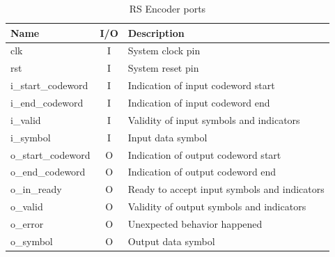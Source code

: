\documentclass[conference]{IEEEtran}
\begin{document}
\begin{table}[!hbt]
\label{tab:t2}
\caption{RS Encoder ports}
\begin{tabular}{lcl}
\toprule
Name               & I/O & Description                                                                                                    \\
\midrule
clk                & I   & System clock pin                                                                                               \\
rst                & I   & System reset pin                                                                                               \\
i\_start\_codeword & I   & Indication of input codeword start                                                                             \\
i\_end\_codeword   & I   & Indication of input codeword end                                                                               \\
i\_valid           & I   & Validity of input symbols and indicators                                                                   \\
i\_symbol          & I   & Input data symbol                                                                                              \\
o\_start\_codeword & O   & Indication of output codeword start                                                                            \\
o\_end\_codeword   & O   & Indication of output codeword end                                                                              \\
o\_in\_ready       & O   & Ready to accept input symbols and indicators\\
o\_valid           & O   & Validity of output symbols and indicators                                                                  \\
o\_error           & O   & Unexpected behavior happened                                                                                   \\
o\_symbol          & O   & Output data symbol                                                                                            
\\
\bottomrule
\end{tabular}
\end{table}
\end{document}
